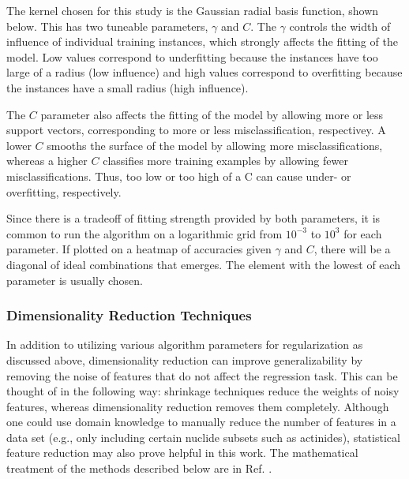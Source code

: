 The kernel chosen for this study is the Gaussian radial basis function, shown
below. This has two tuneable parameters, $\gamma$ and $C$. The $\gamma$
controls the width of influence of individual training instances, which
strongly affects the fitting of the model. Low values correspond to
underfitting because the instances have too large of a radius (low influence)
and high values correspond to overfitting because the instances have a small
radius (high influence). 

The $C$ parameter also affects the fitting of the model by allowing more or
less support vectors, corresponding to more or less misclassification,
respectivey. A lower $C$ smooths the surface of the model by allowing more
misclassifications, whereas a higher $C$ classifies more training examples by
allowing fewer misclassifications. Thus, too low or too high of a C can cause
under- or overfitting, respectively. 

Since there is a tradeoff of fitting strength provided by both parameters, it
is common to run the algorithm on a logarithmic grid from $10^{-3}$ to $10^3$
for each parameter. If plotted on a heatmap of accuracies given $\gamma$ and
$C$, there will be a diagonal of ideal combinations that emerges. The element
with the lowest of each parameter is usually chosen. 

\subsubsection{Dimensionality Reduction Techniques}
\label{sec:dimreduc}

In addition to utilizing various algorithm parameters for regularization as
discussed above, dimensionality reduction can improve generalizability by
removing the noise of features that do not affect the regression task. This can
be thought of in the following way: shrinkage techniques reduce the weights of
noisy features, whereas dimensionality reduction removes them completely.
Although one could use domain knowledge to manually reduce the number of
features in a data set (e.g., only including certain nuclide subsets such as
actinides), statistical feature reduction may also prove helpful in this work.
The mathematical treatment of the methods described below are in Ref.
\cite{elements_stats}.


